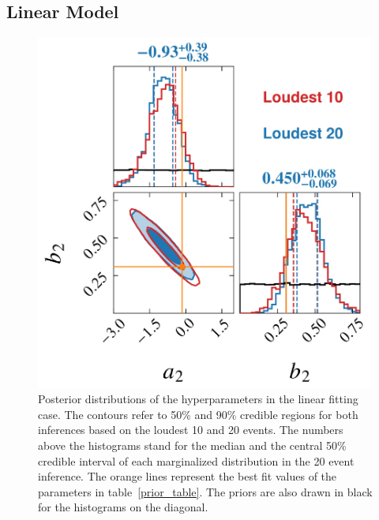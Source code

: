 \documentclass[a4paper,11pt]{article}
\newcommand{\ZW}[1]{\textcolor{magenta}{$\mathcal{ZW}$:~#1}}
\begin{document}
\subsection{Linear Model}
\label{subsec:results_linear_model}
\begin{figure}
    \centering
    \includegraphics[width=0.5\linewidth]{comparison_corner_plot.pdf}
    \caption{Posterior distributions of the hyperparameters in the linear fitting case. The contours refer to 50\% and 90\% credible regions for both inferences based on the loudest 10 and 20 events. The numbers above the histograms stand for the median and the central 50\% credible interval of each marginalized distribution in the 20 event inference. The orange lines represent the best fit values of the parameters in table~\ref{prior_table}. The priors are also drawn in black for the histograms on the diagonal.}
    \label{corner2-d}
\end{figure}
\end{document}
